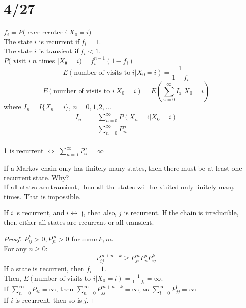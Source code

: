\section*{4/27}
  $f_i = P($ ever reenter $i | X_0 = i)$\\
  The state $i$ is \underline{recurrent} if $f_i = 1$.\\
  The state $i$ is \underline{transient} if $f_i < 1$.\\
  $P($ visit $i$ $n$ times $| X_0 = i) = f_i^{n-1}(1 - f_i)$\\
  $$
    E(\text{number of visits to } i | X_0 = i) = \frac{1}{1 - f_i}
  $$
  $$
    E(\text{number of visits to } i | X_0 = i) = E(\sum_{n = 0}^{\infty} I_n | X_0 = i)
  $$
  where $I_n = I\{X_n = i\}$, $n = 0, 1, 2, \ldots$\\
  \begin{eqnarray*}
    I_n & = & \sum_{n = 0}^{\infty}P(X_n = i | X_0 = i)\\
      & = & \sum_{n = 0}^{\infty}P_{ii}^n\\
  \end{eqnarray*}
  \begin{theorem}
    1 is recurrent $\Leftrightarrow$  $\sum_{n = 1}^{\infty}P_{ii}^n = \infty$
  \end{theorem}
  If a Markov chain only has finitely many states, then there must be at 
  least one recurrent state. Why?\\
  If all states are transient, then all the states will be visited only finitely
  many times. That is impossible. \\
  \begin{proposition}
    If $i$ is recurrent, and $i \leftrightarrow$ j, then also, $j$ is recurrent.
    If the chain is irreducible, then either all states are recurrent or all
    transient.
  \end{proposition}
  \begin{proof}
    $P_{ij}^k > 0, P_{ji}^m > 0$ for some $k,m$.\\
    For any $n \ge 0$:
    $$
      P_{ij}^{m + n + k} \ge P_{ji}^m P_{ii}^n P_{ij}^k
    $$
    If a state is recurrent, then $f_i = 1$. \\
    Then, $E(\text{number of visits to } i | X_0 = i) = \frac{1}{1 - f_i} = \infty$.\\
    If $\sum_{n = 0}^{\infty} P_{ii} = \infty$, then 
    $\sum_{n = 0}^{\infty} P_{jj}^{m+n+k}=\infty$, so
    $\sum_{l = 0}^{\infty} P_{jj}^{l} = \infty$.\\
    If $i$ is recurrent, then so is $j$.
  \end{proof}

